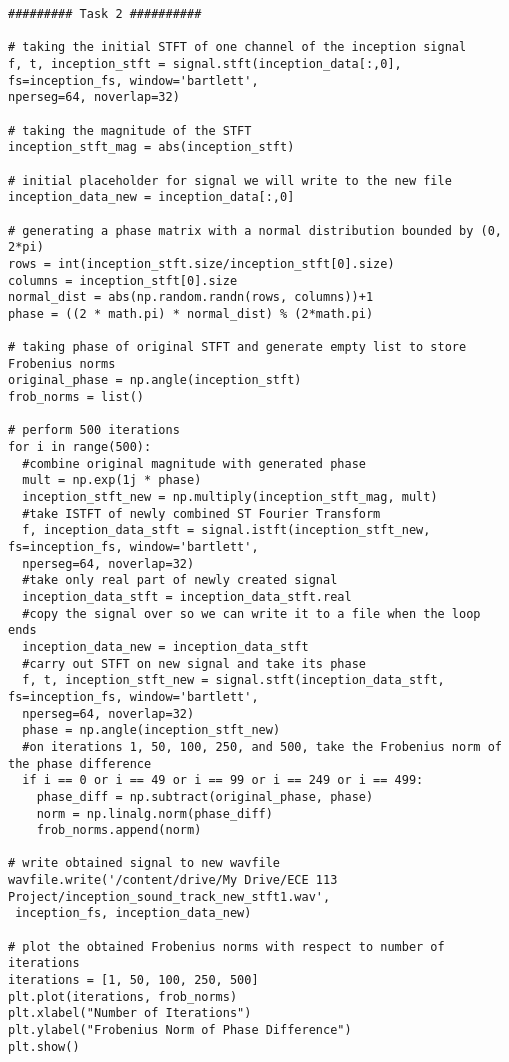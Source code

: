 \documentclass[letterpaper,twocolumn,10pt]{article}
\begin{document}
\begin{verbatim}
######### Task 2 ##########

# taking the initial STFT of one channel of the inception signal
f, t, inception_stft = signal.stft(inception_data[:,0], fs=inception_fs, window='bartlett',
nperseg=64, noverlap=32)

# taking the magnitude of the STFT
inception_stft_mag = abs(inception_stft)

# initial placeholder for signal we will write to the new file
inception_data_new = inception_data[:,0]

# generating a phase matrix with a normal distribution bounded by (0, 2*pi)
rows = int(inception_stft.size/inception_stft[0].size)
columns = inception_stft[0].size
normal_dist = abs(np.random.randn(rows, columns))+1
phase = ((2 * math.pi) * normal_dist) % (2*math.pi)

# taking phase of original STFT and generate empty list to store Frobenius norms
original_phase = np.angle(inception_stft)
frob_norms = list()

# perform 500 iterations
for i in range(500):
  #combine original magnitude with generated phase
  mult = np.exp(1j * phase)
  inception_stft_new = np.multiply(inception_stft_mag, mult)
  #take ISTFT of newly combined ST Fourier Transform
  f, inception_data_stft = signal.istft(inception_stft_new, fs=inception_fs, window='bartlett', 
  nperseg=64, noverlap=32)
  #take only real part of newly created signal
  inception_data_stft = inception_data_stft.real
  #copy the signal over so we can write it to a file when the loop ends
  inception_data_new = inception_data_stft
  #carry out STFT on new signal and take its phase
  f, t, inception_stft_new = signal.stft(inception_data_stft, fs=inception_fs, window='bartlett', 
  nperseg=64, noverlap=32)
  phase = np.angle(inception_stft_new)
  #on iterations 1, 50, 100, 250, and 500, take the Frobenius norm of the phase difference
  if i == 0 or i == 49 or i == 99 or i == 249 or i == 499:
    phase_diff = np.subtract(original_phase, phase)
    norm = np.linalg.norm(phase_diff)
    frob_norms.append(norm)

# write obtained signal to new wavfile
wavfile.write('/content/drive/My Drive/ECE 113 Project/inception_sound_track_new_stft1.wav',
 inception_fs, inception_data_new)

# plot the obtained Frobenius norms with respect to number of iterations
iterations = [1, 50, 100, 250, 500]
plt.plot(iterations, frob_norms)
plt.xlabel("Number of Iterations")
plt.ylabel("Frobenius Norm of Phase Difference")
plt.show()
\end{verbatim}
\end{document}
